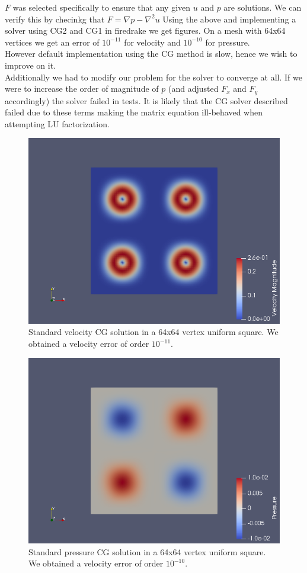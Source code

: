 \documentclass[11pt,twoside,a4paper]{article}
\begin{document}
$F$ was selected specifically to ensure that any given $u$ and $p$ are solutions. We can verify this by checinkg that $F = \nabla p - \nabla^2 u$ 
Using the above and implementing a solver using CG2 and CG1 in firedrake we get figures. On a mesh with 64x64 vertices we get an error of $10^{-11}$ for velocity and $10^{-10}$ for pressure.\\
However default implementation using the CG method is slow, hence we wish to improve on it.\\
Additionally we had to modify our problem for the solver to converge at all. If we were to increase the order of magnitude of $p$ (and adjusted $F_x$ and $F_y$ accordingly) the solver failed in tests. It is likely that the CG solver described failed due to these terms making the matrix equation ill-behaved  when attempting LU factorization.
\begin{figure}
  \includegraphics[width=\linewidth]{lgv.png}
  \caption{Standard velocity CG solution in a 64x64 vertex uniform square. We obtained a velocity error of order $10^{-11}$.}
\end{figure}
\begin{figure}
  \includegraphics[width=\linewidth]{lgp.png}
  \caption{Standard pressure CG solution in a 64x64 vertex uniform square. We obtained a velocity error of order $10^{-10}$.}
\end{figure}
\end{document}
